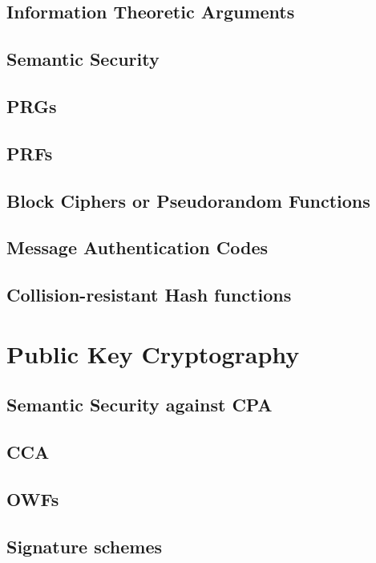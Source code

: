 \documentclass[A4, 11pt]{article}
\begin{document}
\subsection{Information Theoretic Arguments}

\subsection{Semantic Security}

\subsection{PRGs}

\subsection{PRFs}

\subsection{Block Ciphers or Pseudorandom Functions}

\subsection{Message Authentication Codes}

\subsection{Collision-resistant Hash functions}

\section{Public Key Cryptography}

\subsection{Semantic Security against CPA}

\subsection{CCA}

\subsection{OWFs}

\subsection{Signature schemes}
\end{document}
